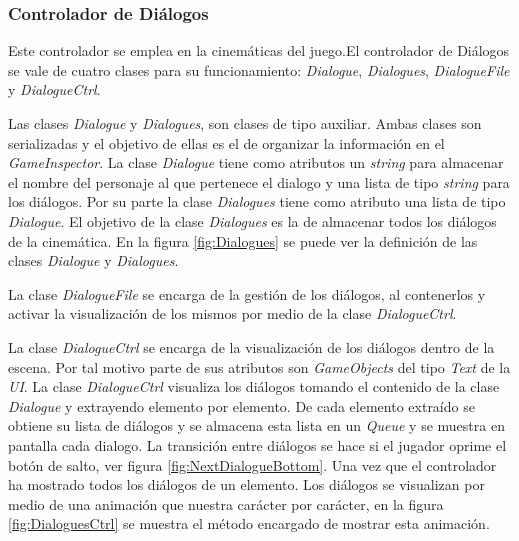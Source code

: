 \subsubsection{Controlador de Diálogos}\label{ControladorDialogo}
Este controlador se emplea en la cinemáticas del juego.El controlador de 
Diálogos se vale de cuatro clases para su funcionamiento: 
\textit{Dialogue}, \textit{Dialogues}, \textit{DialogueFile} y 
\textit{DialogueCtrl}. 
\\
\par
Las clases \textit{Dialogue} y \textit{Dialogues}, son clases de tipo auxiliar. Ambas clases son serializadas y el objetivo de ellas es el de organizar la información en el \textit{GameInspector}. La clase \textit{Dialogue} tiene como atributos un \textit{string} para almacenar el nombre del personaje al que pertenece el dialogo y una lista de tipo \textit{string} para los diálogos. Por su parte la clase \textit{Dialogues} tiene como atributo una lista de tipo \textit{Dialogue}. El objetivo de la clase \textit{Dialogues} es la de almacenar todos los diálogos de la cinemática. En la figura \ref{fig:Dialogues} se puede ver la definición de las clases \textit{Dialogue} y \textit{Dialogues}.
\\
\par
La clase \textit{DialogueFile} se encarga de la gestión de los diálogos, al contenerlos y activar la visualización de los mismos por medio de la clase \textit{DialogueCtrl}. 
\\
\par 
La clase \textit{DialogueCtrl} se encarga de la visualización de los diálogos 
dentro de la escena. Por tal motivo parte de sus atributos son 
\textit{GameObjects} del tipo \textit{Text} de la \textit{UI}. La clase 
\textit{DialogueCtrl} visualiza los diálogos tomando el contenido de la clase 
\textit{Dialogue} y extrayendo elemento por elemento. De cada elemento extraído 
se obtiene su lista de diálogos y se almacena esta lista en un \textit{Queue} y 
se muestra en pantalla cada dialogo. La transición entre diálogos se hace si el 
jugador oprime el botón de salto, ver figura \ref{fig:NextDialogueBottom}. Una 
vez que el controlador ha mostrado todos los diálogos de un elemento. Los 
diálogos se visualizan por medio de una animación que nuestra carácter por 
carácter, en la figura \ref{fig:DialoguesCtrl} se muestra el método encargado de 
mostrar esta animación.   

